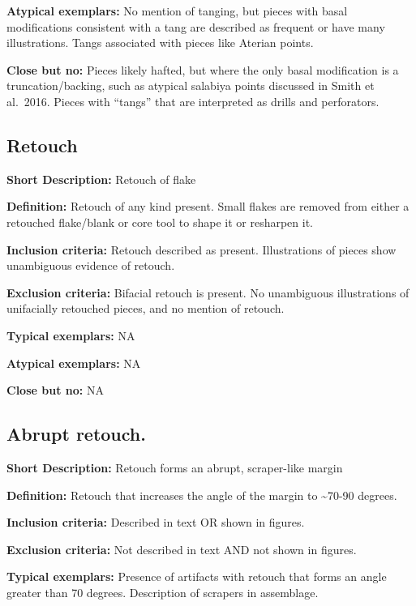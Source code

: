 \documentclass[
]{article}
\begin{document}
\textbf{Atypical exemplars:} No mention of tanging, but pieces with
basal modifications consistent with a tang are described as frequent or
have many illustrations. Tangs associated with pieces like Aterian
points.

\textbf{Close but no:} Pieces likely hafted, but where the only basal
modification is a truncation/backing, such as atypical salabiya points
discussed in Smith et al.~2016. Pieces with ``tangs'' that are
interpreted as drills and perforators.

\hypertarget{retouch}{%
\subsection{Retouch}\label{retouch}}

\textbf{Short Description:} Retouch of flake

\textbf{Definition:} Retouch of any kind present. Small flakes are
removed from either a retouched flake/blank or core tool to shape it or
resharpen it.

\textbf{Inclusion criteria:} Retouch described as present. Illustrations
of pieces show unambiguous evidence of retouch.

\textbf{Exclusion criteria:} Bifacial retouch is present. No unambiguous
illustrations of unifacially retouched pieces, and no mention of
retouch.

\textbf{Typical exemplars:} NA

\textbf{Atypical exemplars:} NA

\textbf{Close but no:} NA

\hypertarget{abrupt-retouch.}{%
\subsection{Abrupt retouch.}\label{abrupt-retouch.}}

\textbf{Short Description:} Retouch forms an abrupt, scraper-like margin

\textbf{Definition:} Retouch that increases the angle of the margin to
\textasciitilde70-90 degrees.

\textbf{Inclusion criteria:} Described in text OR shown in figures.

\textbf{Exclusion criteria:} Not described in text AND not shown in
figures.

\textbf{Typical exemplars:} Presence of artifacts with retouch that
forms an angle greater than 70 degrees. Description of scrapers in
assemblage.
\end{document}
